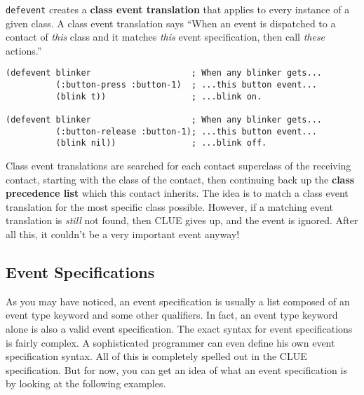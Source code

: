 {\tt defevent}
creates a  {\bf class event translation}
that applies to every instance of a given class.  A class event
translation says  ``When an event is dispatched to a contact of {\em this} class
and it matches {\em this} event specification, then call {\em these} actions.''

\begin{verbatim}
(defevent blinker                    ; When any blinker gets...
          (:button-press :button-1)  ; ...this button event...
          (blink t))                 ; ...blink on.

(defevent blinker                    ; When any blinker gets...
          (:button-release :button-1); ...this button event...
          (blink nil))               ; ...blink off.
\end{verbatim}

Class event translations are searched for each contact superclass of the
receiving contact, starting with the class of the contact, then continuing back
up the {\bf class precedence list} which this
contact inherits\footnotemark{}.  The idea is to match a class event translation
for the
most specific class possible.  However, if a matching event translation is {\em
still} not found, then CLUE gives up, and the event is ignored. After
all this, it couldn't be a very important event anyway!

\subsection{Event Specifications}
As you may have noticed, an event specification is usually a list
composed of an event type keyword and some other qualifiers. In fact, an event
type keyword alone is also a valid event specification.
The exact syntax for event specifications is fairly complex. A sophisticated
programmer can even define his own event specification syntax. All of this is
completely spelled out in the CLUE specification. But for now, you can get an
idea of what an event specification is by looking at the following examples.

